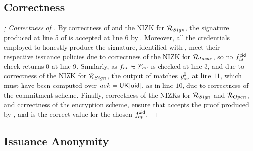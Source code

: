 \subsection{Correctness}

\begin{proof}[; Correctness of \CUASGen]
  By correctness of \SBCM and the NIZK for $\mathcal{R}_{Sign}$, the signature
  produced at line 5 of \ExpCorrect is accepted at line 6 by \Verify.
  Moreover, all the credentials employed to honestly produce the signature,
  identified with \scid, meet their respective issuance policies due to
  correctness of the NIZK for $\mathcal{R}_{Issue}$, so no $f_{is}^\mathsf{cid}$ check
  returns $0$ at line 9. Similarly, as $f_{ev} \in \mathcal{F}_{ev}$ is checked at
  line 3, and due to correctness of the NIZK for $\mathcal{R}_{Sign}$, the
  output of \feval matches $y_{ev}^0$ at line $11$, which must have been
  computed over $usk=\mathsf{UK}[\mathsf{uid}]$, as in line $10$, due to correctness of the
  commitment scheme. Finally, correctness of the NIZKs for $\mathcal{R}_{Sign}$
  and $\mathcal{R}_{Open}$, and correctness of the encryption scheme, ensure that
  \Judge accepts the proof produced by \Open, and \yinsp is the correct value
  for the chosen $f_{op}^{\mathsf{oid}}$.
\end{proof}

\subsection{Issuance Anonymity}

